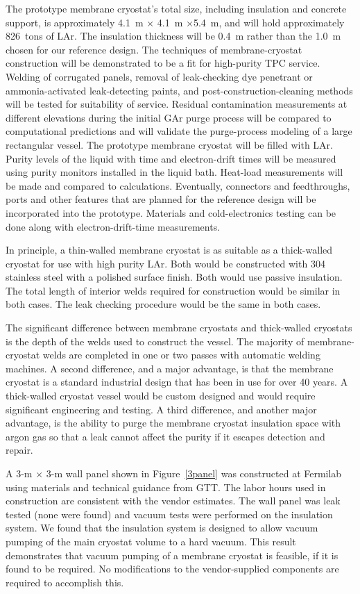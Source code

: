 The prototype membrane cryostat's total size, including insulation and concrete support, is approximately 4.1~m $\times$ 4.1~m $\times$5.4~m, and will hold approximately 826~tons of LAr. The insulation thickness will be 0.4~m rather than the 1.0~m chosen for our reference design.  The techniques of membrane-cryostat construction will be demonstrated to be a fit for high-purity TPC service.  Welding of corrugated panels, removal of leak-checking dye penetrant or ammonia-activated leak-detecting paints, and post-construction-cleaning methods will be tested for suitability of service.  Residual contamination measurements at different elevations during the initial GAr purge process will be compared to computational predictions and will validate the purge-process modeling of a large rectangular vessel.  The prototype membrane cryostat will be filled with LAr.  Purity levels of the liquid with time and electron-drift times will be measured using purity monitors installed in the liquid bath.  Heat-load measurements will be made and compared to calculations. Eventually, connectors and feedthroughs, ports and other features that are planned for the reference design will be incorporated into the prototype.  Materials and cold-electronics testing can be done along with electron-drift-time measurements.

In principle, a thin-walled membrane cryostat is as suitable as a thick-walled cryostat for use with high purity LAr. Both would be constructed with 304 stainless steel with a polished surface finish. Both would use passive insulation. The total length of interior welds required for construction would be similar in both cases. The leak checking procedure would be the same in both cases.

The significant difference between membrane cryostats and thick-walled cryostats is the depth of the welds used to construct the vessel.  The majority of membrane-cryostat welds are completed in one or two passes with automatic welding machines. A second difference, and a major advantage, is that the membrane cryostat is a standard industrial design that has been in use for over 40 years. A thick-walled cryostat vessel would be custom designed and would require significant engineering and testing. A third difference, and another major advantage, is the ability to purge the membrane cryostat insulation space with argon gas so that a leak cannot affect the purity if it escapes detection and repair. 

A 3-m $\times$ 3-m wall panel shown in Figure~\ref{3panel} was constructed at Fermilab using materials and technical guidance from GTT. The labor hours used in construction are consistent with the vendor estimates. The wall panel was leak tested (none were found) and vacuum tests were performed on the insulation system. We found that the insulation system is designed to allow vacuum pumping of the main cryostat volume to a hard vacuum. This result demonstrates that vacuum pumping of a membrane cryostat is feasible, if it is found to be required. No modifications to the vendor-supplied components are required to accomplish this.

